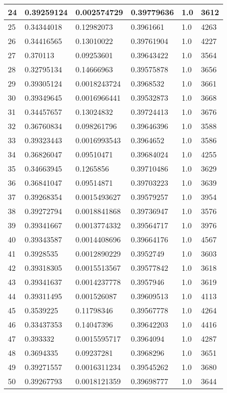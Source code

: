 \begin{longtable}{|l|l|l|l|l|l|}
24 & 0.39259124 & 0.002574729 & 0.39779636 & 1.0 & 3612 \\ \hline 
25 & 0.34344018 & 0.12982073 & 0.3961661 & 1.0 & 4263 \\ \hline 
26 & 0.34416565 & 0.13010022 & 0.39761904 & 1.0 & 4227 \\ \hline 
27 & 0.370113 & 0.09253601 & 0.39643422 & 1.0 & 3564 \\ \hline 
28 & 0.32795134 & 0.14666963 & 0.39575878 & 1.0 & 3656 \\ \hline 
29 & 0.39305124 & 0.0018243724 & 0.3968532 & 1.0 & 3661 \\ \hline 
30 & 0.39349645 & 0.0016966441 & 0.39532873 & 1.0 & 3668 \\ \hline 
31 & 0.34457657 & 0.13024832 & 0.39724413 & 1.0 & 3676 \\ \hline 
32 & 0.36760834 & 0.098261796 & 0.39646396 & 1.0 & 3588 \\ \hline 
33 & 0.39323443 & 0.0016993543 & 0.3964652 & 1.0 & 3586 \\ \hline 
34 & 0.36826047 & 0.09510471 & 0.39684024 & 1.0 & 4255 \\ \hline 
35 & 0.34663945 & 0.1265856 & 0.39710486 & 1.0 & 3629 \\ \hline 
36 & 0.36841047 & 0.09514871 & 0.39703223 & 1.0 & 3639 \\ \hline 
37 & 0.39268354 & 0.0015493627 & 0.39579257 & 1.0 & 3954 \\ \hline 
38 & 0.39272794 & 0.0018841868 & 0.39736947 & 1.0 & 3576 \\ \hline 
39 & 0.39341667 & 0.0013774332 & 0.39564717 & 1.0 & 3976 \\ \hline 
40 & 0.39343587 & 0.0014408696 & 0.39664176 & 1.0 & 4567 \\ \hline 
41 & 0.3928535 & 0.0012890229 & 0.3952749 & 1.0 & 3603 \\ \hline 
42 & 0.39318305 & 0.0015513567 & 0.39577842 & 1.0 & 3618 \\ \hline 
43 & 0.39341637 & 0.0014237778 & 0.3957946 & 1.0 & 3619 \\ \hline 
44 & 0.39311495 & 0.001526087 & 0.39609513 & 1.0 & 4113 \\ \hline 
45 & 0.3539225 & 0.11798346 & 0.39567778 & 1.0 & 4264 \\ \hline 
46 & 0.33437353 & 0.14047396 & 0.39642203 & 1.0 & 4416 \\ \hline 
47 & 0.393332 & 0.0015595717 & 0.3964094 & 1.0 & 4287 \\ \hline 
48 & 0.3694335 & 0.09237281 & 0.3968296 & 1.0 & 3651 \\ \hline 
49 & 0.39271557 & 0.0016311234 & 0.39545262 & 1.0 & 3680 \\ \hline 
50 & 0.39267793 & 0.0018121359 & 0.39698777 & 1.0 & 3644 \\ \hline 
\end{longtable}